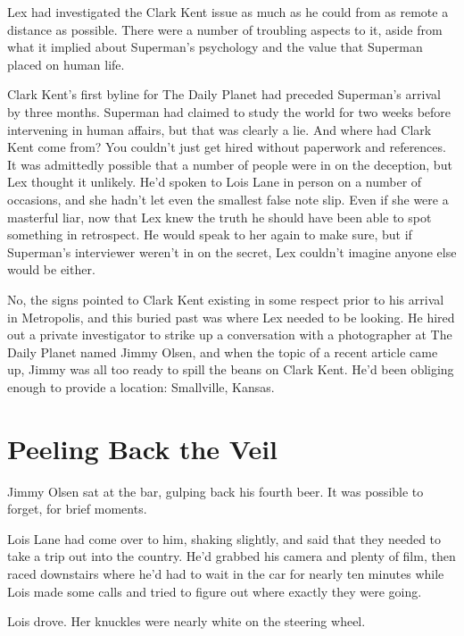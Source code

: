 \documentclass[ebook,12pt]{memoir}
\begin{document}
Lex had investigated the Clark Kent issue as much as he could from as
remote a distance as possible. There were a number of troubling aspects
to it, aside from what it implied about Superman's psychology and the
value that Superman placed on human life.

Clark Kent's first byline for The Daily Planet had preceded Superman's
arrival by three months. Superman had claimed to study the world for two
weeks before intervening in human affairs, but that was clearly a lie.
And where had Clark Kent come from? You couldn't just get hired without
paperwork and references. It was admittedly possible that a number of
people were in on the deception, but Lex thought it unlikely. He'd
spoken to Lois Lane in person on a number of occasions, and she hadn't
let even the smallest false note slip. Even if she were a masterful
liar, now that Lex knew the truth he should have been able to spot
something in retrospect. He would speak to her again to make sure, but
if Superman's interviewer weren't in on the secret, Lex couldn't imagine
anyone else would be either.

No, the signs pointed to Clark Kent existing in some respect prior to
his arrival in Metropolis, and this buried past was where Lex needed to
be looking. He hired out a private investigator to strike up a
conversation with a photographer at The Daily Planet named Jimmy Olsen,
and when the topic of a recent article came up, Jimmy was all too ready
to spill the beans on Clark Kent. He'd been obliging enough to provide a
location: Smallville, Kansas.



\hypertarget{peeling-back-the-veil}{%
\chapter{Peeling Back the Veil}\label{peeling-back-the-veil}}

Jimmy Olsen sat at the bar, gulping back his fourth beer. It was
possible to forget, for brief moments.

Lois Lane had come over to him, shaking slightly, and said that they
needed to take a trip out into the country. He'd grabbed his camera and
plenty of film, then raced downstairs where he'd had to wait in the car
for nearly ten minutes while Lois made some calls and tried to figure
out where exactly they were going.

Lois drove. Her knuckles were nearly white on the steering wheel.
\end{document}
